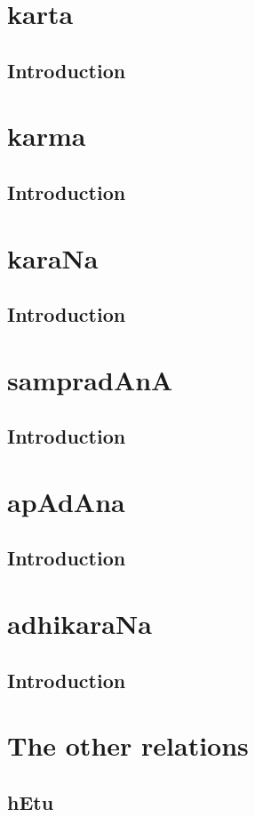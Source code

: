 \documentclass[a4paper,10pt]{article}
\begin{document}
\newpage
\section{karta}
  \subsection{Introduction}
\newpage
\section{karma}
  \subsection{Introduction}
\newpage
\section{karaNa}
  \subsection{Introduction}
\newpage
\section{sampradAnA}
  \subsection{Introduction}
\newpage
\section{apAdAna}
  \subsection{Introduction}
\newpage
\section{adhikaraNa}
  \subsection{Introduction}
\newpage
\section{The other relations}
  \subsection{hEtu}
\end{document}
